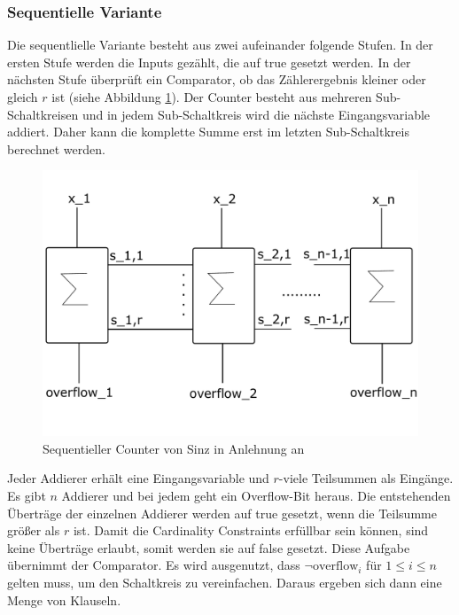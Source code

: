 \documentclass[a4,abstract=on]{scrartcl}
\begin{document}
		\subsubsection{Sequentielle Variante}
Die sequentlielle Variante besteht aus zwei aufeinander folgende Stufen. In der ersten Stufe werden die Inputs gezählt, die auf true gesetzt werden. In der nächsten Stufe überprüft ein Comparator, ob das Zählerergebnis kleiner oder gleich $r$ ist (siehe Abbildung \ref{fig:sinz_counter}). Der Counter besteht aus mehreren Sub-Schaltkreisen und in jedem Sub-Schaltkreis wird die nächste Eingangsvariable addiert. Daher kann die komplette Summe erst im letzten Sub-Schaltkreis berechnet werden. \\


\begin{figure}[H]
\centering
\includegraphics[width=\textwidth]{Sinz_seq.pdf}
\caption{Sequentieller Counter von Sinz in Anlehnung an \cite[][] {sinz}}
\label{fig:sinz_counter}
\end{figure}

Jeder Addierer erhält eine Eingangsvariable und $r$-viele Teilsummen als Eingänge. Es gibt $n$ Addierer und bei jedem geht ein Overflow-Bit heraus. Die entstehenden Überträge der einzelnen Addierer werden auf true gesetzt, wenn die Teilsumme größer als $r$ ist. Damit die Cardinality Constraints erfüllbar sein können, sind keine Überträge erlaubt, somit werden sie auf false gesetzt. Diese Aufgabe übernimmt der Comparator. Es wird ausgenutzt, dass $\neg \text{overflow}_i$ für $1 \leq i \leq n$ gelten muss, um den Schaltkreis zu vereinfachen. Daraus ergeben sich dann eine Menge von Klauseln.
\end{document}
